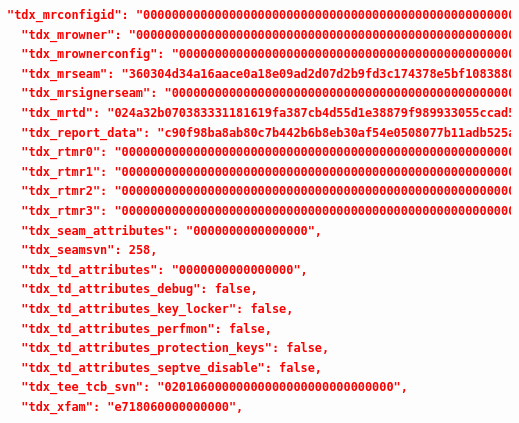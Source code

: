 \begin{lstlisting}[language=json]
  "tdx_mrconfigid": "000000000000000000000000000000000000000000000000000000000000000000000000000000000000000000000000",
  "tdx_mrowner": "000000000000000000000000000000000000000000000000000000000000000000000000000000000000000000000000",
  "tdx_mrownerconfig": "000000000000000000000000000000000000000000000000000000000000000000000000000000000000000000000000",
  "tdx_mrseam": "360304d34a16aace0a18e09ad2d07d2b9fd3c174378e5bf108388079827f89ff62acc5f8c473dd40706324834e202946",
  "tdx_mrsignerseam": "000000000000000000000000000000000000000000000000000000000000000000000000000000000000000000000000",
  "tdx_mrtd": "024a32b070383331181619fa387cb4d55d1e38879f989933055ccad5bc2db795d1737b66205949d15469dc8c1ba7ab7b",
  "tdx_report_data": "c90f98ba8ab80c7b442b6b8eb30af54e0508077b11adb525af6dfbcc8714e52a0000000000000000000000000000000000000000000000000000000000000000",
  "tdx_rtmr0": "000000000000000000000000000000000000000000000000000000000000000000000000000000000000000000000000",
  "tdx_rtmr1": "000000000000000000000000000000000000000000000000000000000000000000000000000000000000000000000000",
  "tdx_rtmr2": "000000000000000000000000000000000000000000000000000000000000000000000000000000000000000000000000",
  "tdx_rtmr3": "000000000000000000000000000000000000000000000000000000000000000000000000000000000000000000000000",
  "tdx_seam_attributes": "0000000000000000",
  "tdx_seamsvn": 258,
  "tdx_td_attributes": "0000000000000000",
  "tdx_td_attributes_debug": false,
  "tdx_td_attributes_key_locker": false,
  "tdx_td_attributes_perfmon": false,
  "tdx_td_attributes_protection_keys": false,
  "tdx_td_attributes_septve_disable": false,
  "tdx_tee_tcb_svn": "02010600000000000000000000000000",
  "tdx_xfam": "e718060000000000",
\end{lstlisting}
